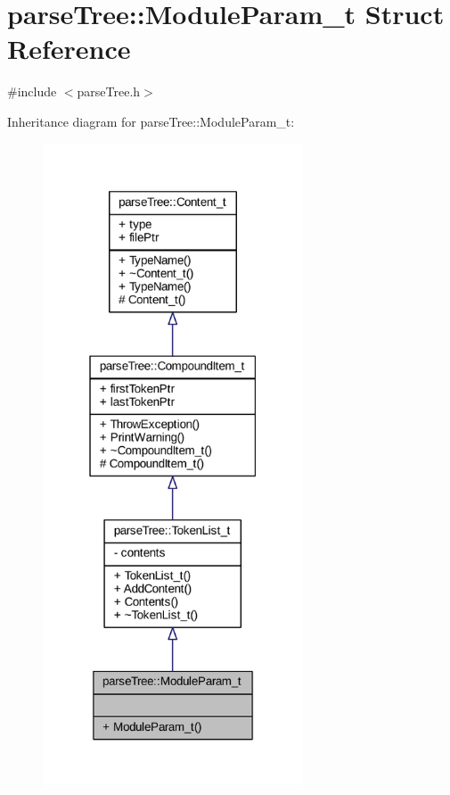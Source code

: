 \hypertarget{structparse_tree_1_1_module_param__t}{}\section{parse\+Tree\+:\+:Module\+Param\+\_\+t Struct Reference}
\label{structparse_tree_1_1_module_param__t}


{\ttfamily \#include $<$parse\+Tree.\+h$>$}



Inheritance diagram for parse\+Tree\+:\+:Module\+Param\+\_\+t\+:
\nopagebreak
\begin{figure}[H]
\begin{center}
\leavevmode
\includegraphics[width=219pt]{structparse_tree_1_1_module_param__t__inherit__graph}
\end{center}
\end{figure}


